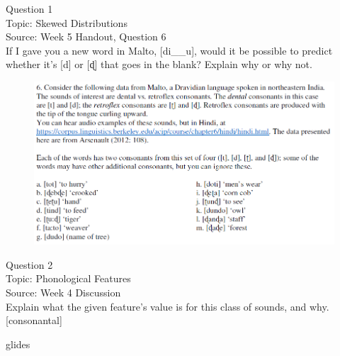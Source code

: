 \documentclass[12pt]{article}
\begin{document}
\begin{center}
\textbf{{\color{blue}{\HUGE START OF EXAM\\}}}

\textbf{{\color{blue}{\HUGE Student ID: 74752\\}}}

\textbf{{\color{blue}{\HUGE 10:30\\}}}

\end{center}
\newpage

{\large Question 1}\\

Topic: Skewed Distributions\\
Source: Week 5 Handout, Question 6\\

If I gave you a new word in Malto, [di\_\_u], would it be possible to predict whether it's [d] or [ɖ] that goes in the blank? Explain why or why not.\\

\begin{figure}[H]
\includegraphics{../images/malto.png}
\end{figure}

\newpage

{\large Question 2}\\

Topic: Phonological Features\\
Source: Week 4 Discussion\\

Explain what the given feature’s value is for this class of sounds, and why.\\

{[consonantal]}

glides


\newpage

\begin{center}
\textbf{{\color{red}{\HUGE END OF EXAM}}}\\

\end{center}
\newpage
\end{document}
